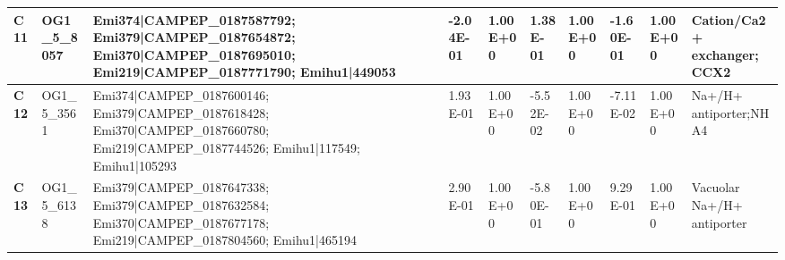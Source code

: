 \begin{landscape}
\begin{center}
\begin{footnotesize}
\begin{longtable}{|p{0.5cm}|p{1.5cm}|p{4cm}|l|l|l|l|l|l|l|}
\textbf{C11} & OG1\_5\_8057  & Emi374|CAMPEP\_0187587792; Emi379|CAMPEP\_0187654872; Emi370|CAMPEP\_0187695010; Emi219|CAMPEP\_0187771790; Emihu1|449053                                                                                                                                                                                                                                                                                                                                                                                                                                                                                                                & -2.04E-01 & 1.00E+00 & 1.38E-01  & 1.00E+00 & -1.60E-01 & 1.00E+00 & Cation/Ca2+ exchanger; CCX2                                                  \\ \hline
\textbf{C12} & OG1\_5\_3561  & Emi374|CAMPEP\_0187600146; Emi379|CAMPEP\_0187618428; Emi370|CAMPEP\_0187660780; Emi219|CAMPEP\_0187744526; Emihu1|117549; Emihu1|105293                                                                                                                                                                                                                                                                                                                                                                                                                                                                                                 & 1.93E-01  & 1.00E+00 & -5.52E-02 & 1.00E+00 & -7.11E-02 & 1.00E+00 & Na+/H+ antiporter;NHA4                                                       \\ \hline
\textbf{C13} & OG1\_5\_6138  & Emi379|CAMPEP\_0187647338; Emi379|CAMPEP\_0187632584; Emi370|CAMPEP\_0187677178; Emi219|CAMPEP\_0187804560; Emihu1|465194                                                                                                                                                                                                                                                                                                                                                                                                                                                                                                                & 2.90E-01  & 1.00E+00 & -5.80E-01 & 1.00E+00 & 9.29E-01  & 1.00E+00 & Vacuolar Na+/H+ antiporter                                                   \\ \hline

\end{longtable}
\end{footnotesize}
\end{center}
\end{landscape}
